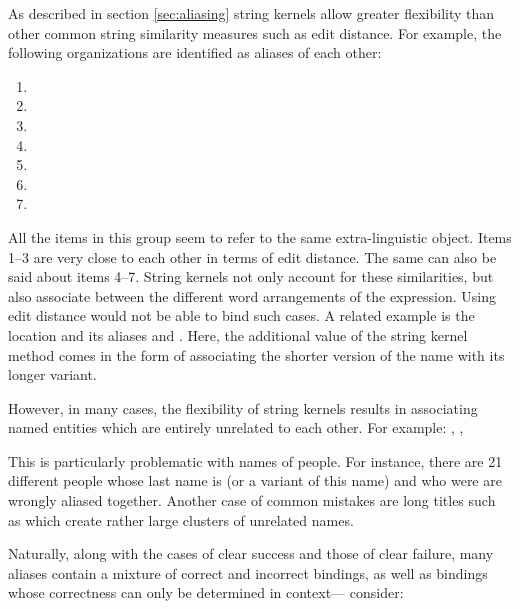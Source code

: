 As described in section \ref{sec:aliasing} string kernels allow greater flexibility than other common string similarity measures such as edit distance.
For example, the following organizations are identified as aliases of each other:
\begin{enumerate}
\item  {}
\item  {}
\item  {}
\item  {}
\item  {}
\item  {}
\item  {}
\end{enumerate}
All the items in this group seem to refer to the same extra-linguistic object. Items 1--3 are very close to each other in terms of edit distance.
The same can also be said about items 4--7. String kernels not only account for these similarities, but also associate between the different word arrangements of the expression. Using edit distance would not be able to bind such cases. A related example is the location  and its aliases 
 and . Here, the additional value of the string kernel method comes in the form of associating the shorter version of the
name with its longer variant. 

However, in many cases, the flexibility of string kernels results in associating named entities which are entirely unrelated to each other. For example: , , 

This is particularly problematic with names of people. For instance, there are 21 different people whose last name is  (or a variant of this name) and who were are wrongly aliased together. Another case of common mistakes are long titles such as  which create rather large clusters of unrelated names.   
 
Naturally, along with the cases of clear success and those of clear failure, many aliases contain a mixture of correct and incorrect bindings, as well as bindings whose correctness can only be determined in context--- consider:

